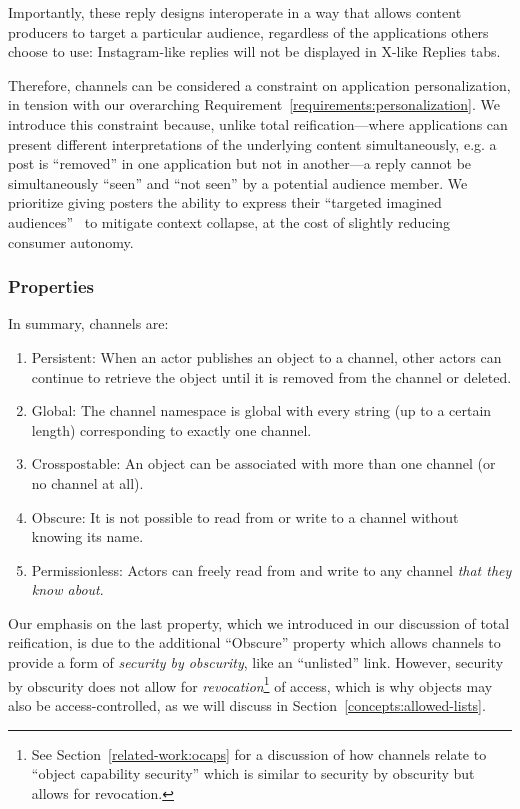 Importantly, these reply designs interoperate in a way that allows content producers to target a particular audience,
regardless of the applications others choose to use:
Instagram-like replies will not be displayed in X-like Replies tabs.

Therefore, channels can be considered a constraint on application personalization,
in tension with our overarching Requirement~\ref{requirements:personalization}.
We introduce this constraint because, unlike total reification---where applications
can present different interpretations of the underlying
content simultaneously, e.g. a post is ``removed'' in one application but not in another---a reply
cannot be simultaneously ``seen'' and ``not seen'' by a potential audience member.
We prioritize giving posters the ability to express their ``targeted imagined audiences''~\cite{imaginedaudience}
to mitigate context collapse, at the cost of slightly reducing consumer autonomy.

\subsubsection{Properties}

In summary, channels are:

\begin{enumerate}
\item
Persistent: When an actor publishes an object to a channel, other actors can
continue to retrieve the object until it is removed from the channel or deleted.
\item
Global: The channel namespace is global with every string (up to a certain length)
corresponding to exactly one channel.
\item
Crosspostable: An object can be associated with more than one channel (or no channel at all).
\item
Obscure: It is not possible to read from or write to a channel without knowing
its name.
\item
Permissionless: Actors can freely read from and write to any channel \emph{that they know about}.
\end{enumerate}

Our emphasis on the last property, which we introduced in our discussion of
total reification, is due to the additional ``Obscure'' property
which allows channels to provide a form of \emph{security by obscurity}, like an ``unlisted'' link.
However, security by obscurity does not allow for \emph{revocation}\footnote{
    See Section~\ref{related-work:ocaps} for a discussion of how channels relate to ``object capability security''
    which is similar to security by obscurity but allows for revocation.
}
of access,
which is why objects may also be access-controlled,
as we will discuss in Section~{\ref{concepts:allowed-lists}}.

